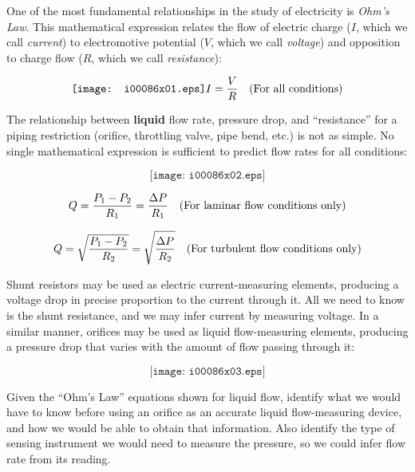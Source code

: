 

One of the most fundamental relationships in the study of electricity is {\it Ohm's Law}.  This mathematical expression relates the flow of electric charge ($I$, which we call {\it current}) to electromotive potential ($V$, which we call {\it voltage}) and opposition to charge flow ($R$, which we call {\it resistance}):

$$\texttt{[image: i00086x01.eps]} I = {V \over R} \hbox{\hskip 10pt} \hbox{(For all conditions)}$$

The relationship between {\bf liquid} flow rate, pressure drop, and ``resistance'' for a piping restriction (orifice, throttling valve, pipe bend, etc.) is not as simple.  No single mathematical expression is sufficient to predict flow rates for all conditions:

$$\texttt{[image: i00086x02.eps]}$$

$$Q = {{P_1 - P_2} \over R_1} = {\Delta P \over R_1} \hbox{\hskip 10pt}  \hbox{(For laminar flow conditions only)}$$

\vskip 10pt

$$Q = \sqrt{{P_1 - P_2} \over R_2} = \sqrt{\Delta P \over R_2} \hbox{\hskip 10pt}  \hbox{(For turbulent flow conditions only)}$$

Shunt resistors may be used as electric current-measuring elements, producing a voltage drop in precise proportion to the current through it.  All we need to know is the shunt resistance, and we may infer current by measuring voltage.  In a similar manner, orifices may be used as liquid flow-measuring elements, producing a pressure drop that varies with the amount of flow passing through it:

$$\texttt{[image: i00086x03.eps]}$$

Given the ``Ohm's Law'' equations shown for liquid flow, identify what we would have to know before using an orifice as an accurate liquid flow-measuring device, and how we would be able to obtain that information.  Also identify the type of sensing instrument we would need to measure the pressure, so we could infer flow rate from its reading.






